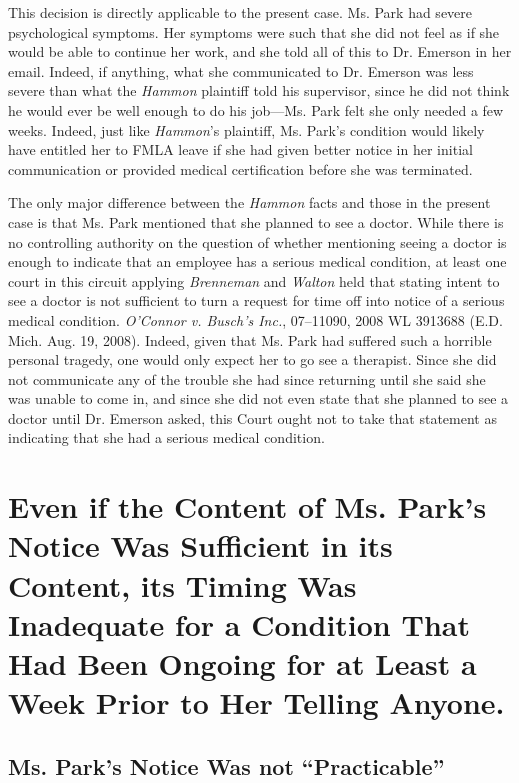This decision is directly applicable to the present case. Ms. Park had severe psychological symptoms. Her symptoms were such that she did not feel as if she would be able to continue her work, and she told all of this to Dr. Emerson in her email. Indeed, if anything, what she communicated to Dr. Emerson was less severe than what the \emph{Hammon} plaintiff told his supervisor, since he did not think he would ever be well enough to do his job—Ms. Park felt she only needed a few weeks. Indeed, just like \emph{Hammon}'s plaintiff, Ms. Park's condition would likely have entitled her to FMLA leave if she had given better notice in her initial communication or provided medical certification before she was terminated.

The only major difference between the \emph{Hammon} facts and those in the present case is that Ms. Park mentioned that she planned to see a doctor. While there is no controlling authority on the question of whether mentioning seeing a doctor is enough to indicate that an employee has a serious medical condition, at least one court in this circuit applying \emph{Brenneman} and \emph{Walton} held that stating intent to see a doctor is not sufficient to turn a request for time off into notice of a serious medical condition. \emph{O'Connor v. Busch's Inc.}, 07--11090, 2008 WL 3913688 (E.D. Mich. Aug. 19, 2008). Indeed, given that Ms. Park had suffered such a horrible personal tragedy, one would only expect her to go see a therapist. Since she did not communicate any of the trouble she had since returning until she said she was unable to come in, and since she did not even state that she planned to see a doctor until Dr. Emerson asked, this Court ought not to take that statement as indicating that she had a serious medical condition.

\chapter{Even if the Content of Ms. Park's Notice Was Sufficient in its Content, its Timing Was Inadequate for a Condition That Had Been Ongoing for at Least a Week Prior to Her Telling Anyone.}
\label{evenifthecontentofms.parksnoticewassufficientinitscontentitstimingwasinadequateforaconditionthathadbeenongoingforatleastaweekpriortohertellinganyone.}

\section{Ms. Park's Notice Was not ``Practicable''}
\label{ms.parksnoticewasnotpracticable}

